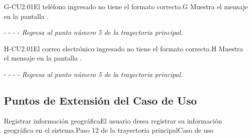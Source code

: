 		\begin{UCtrayectoriaA}{G-CU2.01}{El teléfono ingresado no tiene el formato correcto.}{G}
			\UCpaso[\UCsist] Muestra el mensaje  en la pantalla .
			\item[- -] - - {\em Regresa al punto número 5 de la trayectoria principal.} 
    \end{UCtrayectoriaA}
    
    \begin{UCtrayectoriaA}{H-CU2.01}{El correo electrónico ingresado no tiene el formato correcto.}{H}
			\UCpaso[\UCsist] Muestra el mensaje  en la pantalla .
			\item[- -] - - {\em Regresa al punto número 5 de la trayectoria principal.} 
    \end{UCtrayectoriaA}
 
	\subsection{Puntos de Extensión del Caso de Uso}
	
	\begin{UCExtenssionPoint}{Registrar información geográfica}{El usuario desea registrar su información geográfica en el sistema.}{Paso 12 de la trayectoria principal}{Caso de uso } 
	\end{UCExtenssionPoint}